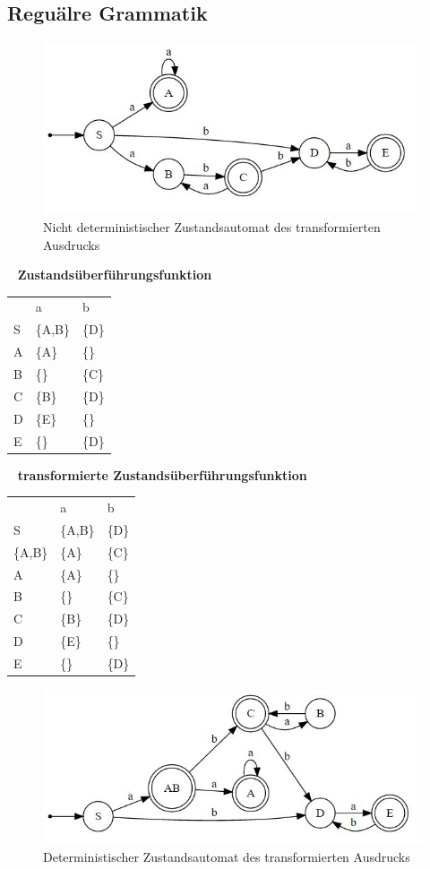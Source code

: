 \documentclass[11pt, a4paper, twoside]{article}   	%
\begin{document}
\subsection{Reguälre Grammatik}
\begin{figure}[h]
\centering
\includegraphics[scale=1]{transformed_regular_exp.JPG}
\caption{Nicht deterministischer Zustandsautomat des transformierten Ausdrucks}
\label{fig:ada-state-machine}
\end{figure}
\ \newline
\textbf{Zustandsüberführungsfunktion}
\newline
\begin{tabularx}{10cm}{p{30pt} XX}
    & a & b \\
 S  & \{A,B\} & \{D\} \\
 A  & \{A\} & \{\} \\
 B  & \{\} & \{C\} \\
 C  & \{B\} & \{D\} \\
 D  & \{E\} & \{\} \\
 E  & \{\} & \{D\} \\
\end{tabularx}
\ \newline
\newline
\newline
\textbf{transformierte Zustandsüberführungsfunktion}
\newline
\begin{tabularx}{10cm}{p{30pt} XX}
    & a & b \\
 S        & \{A,B\} & \{D\} \\
 \{A,B\}  & \{A\} & \{C\} \\
 A        & \{A\} & \{\} \\
 B        & \{\} & \{C\} \\
 C        & \{B\} & \{D\} \\
 D        & \{E\} & \{\} \\
 E        & \{\} & \{D\} \\
\end{tabularx}
\begin{figure}[h]
\centering
\includegraphics[scale=1]{transformed_regular_exp_determeneistic.JPG}
\caption{Deterministischer Zustandsautomat des transformierten Ausdrucks}
\label{fig:ada-state-machine}
\end{figure}
\end{document}
